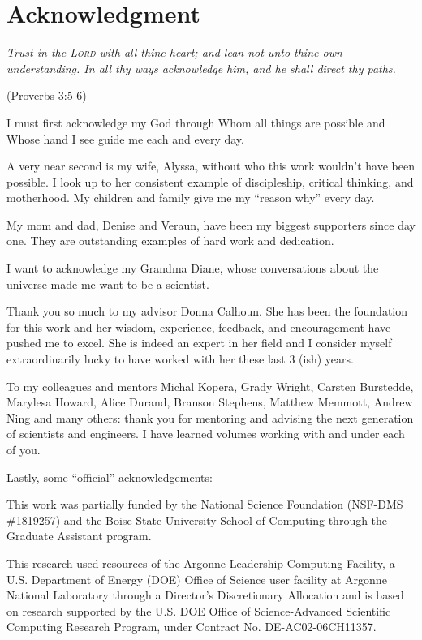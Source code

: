 \chapter*{Acknowledgment}

\begin{center}
{\em Trust in the \textsc{Lord} with all thine heart; and lean not unto thine own understanding. In all thy ways acknowledge him, and he shall direct thy paths.}

(Proverbs 3:5-6)
\end{center}

I must first acknowledge my God through Whom all things are possible and Whose hand I see guide me each and every day.

A very near second is my wife, Alyssa, without who this work wouldn't have been possible. I look up to her consistent example of discipleship, critical thinking, and motherhood. My children and family give me my ``reason why'' every day.

My mom and dad, Denise and Veraun, have been my biggest supporters since day one. They are outstanding examples of hard work and dedication.

I want to acknowledge my Grandma Diane, whose conversations about the universe made me want to be a scientist.

Thank you so much to my advisor Donna Calhoun. She has been the foundation for this work and her wisdom, experience, feedback, and encouragement have pushed me to excel. She is indeed an expert in her field and I consider myself extraordinarily lucky to have worked with her these last 3 (ish) years.

To my colleagues and mentors Michal Kopera, Grady Wright, Carsten Burstedde, Marylesa Howard, Alice Durand, Branson Stephens, Matthew Memmott, Andrew Ning and many others: thank you for mentoring and advising the next generation of scientists and engineers. I have learned volumes working with and under each of you.

Lastly, some ``official'' acknowledgements:

This work was partially funded by the National Science Foundation (NSF-DMS \#1819257) and the Boise State University School of Computing through the Graduate Assistant program.

This research used resources of the Argonne Leadership Computing Facility, a U.S. Department of Energy (DOE) Office of Science user facility at Argonne National Laboratory through a Director's Discretionary Allocation and is based on research supported by the U.S. DOE Office of Science-Advanced Scientific Computing Research Program, under Contract No. DE-AC02-06CH11357.

